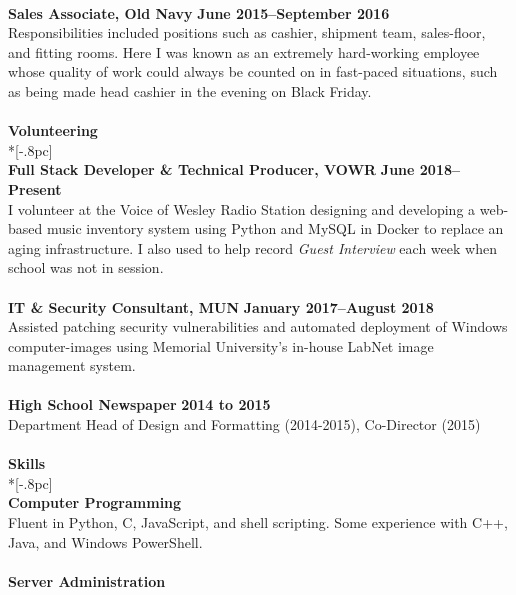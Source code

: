 \documentclass[letterpaper]{article}
\let\dateshape\bf
\begin{document}
\\
{\bf Sales Associate, Old Navy } \hfill {\dateshape June 2015--September 2016\/} \\
Responsibilities included positions such as cashier, shipment team, sales-floor,
and fitting rooms. Here I was known as an extremely hard-working employee whose
quality of work could always be counted on in fast-paced situations, such as 
being made head cashier in the evening on Black Friday. \\
\\[0.5pc] %
{\large \bf Volunteering} \\*[-.8pc]
\underline{\hspace{\textwidth}} \\[0.5pc]
{\bf Full Stack Developer \& Technical Producer, VOWR} \hfill {\dateshape June 2018--Present\/} \\
I volunteer at the Voice of Wesley Radio Station designing and developing a web-based music inventory system using Python and MySQL in Docker to replace an aging infrastructure. I also used to help record {\em Guest Interview} each week when school was not in session. \\
\\
{\bf IT \& Security Consultant, MUN} \hfill {\dateshape January 2017--August 2018\/} \\
Assisted patching security vulnerabilities and automated deployment of Windows 
computer-images using Memorial University's in-house LabNet image management system. \\
\\
{\bf High School Newspaper} \hfill {\dateshape 2014 to 2015\/} \\
Department Head of Design and Formatting (2014-2015), Co-Director (2015)  \\
\\[0.5pc]
{\large \bf Skills} \\*[-.8pc]
\underline{\hspace{\textwidth}} \\[0.5pc]
{\bf Computer Programming} \\
Fluent in Python, C, JavaScript, and shell scripting. Some experience with C++, Java, and Windows PowerShell. \\
\\
{\bf Server Administration} \\
\end{document}
